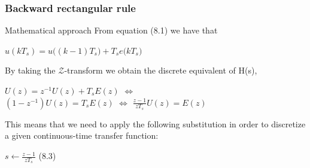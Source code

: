 \begin{frame}
	\frametitle{Backward rectangular rule}
	\begin{block}{Mathematical approach}
		From equation (8.1) we have that
		\begin{center}
			$u(kT_s) = u\big((k-1)T_s \big) + T_s e \big(kT_s \big)$\\
		\end{center}
		By taking the $\mathcal{Z}$-transform we obtain the discrete equivalent of H(s),
		\vspace{-1em}
		\begin{center}
			$U(z) = z^{-1}U(z) + T_s E(z)$ \hspace{0.5em} $\Leftrightarrow$ \hspace{0.5em} \\$(1 - z^{-1})U(z) = T_s E(z)$ \hspace{0.5em} $\Leftrightarrow$ \hspace{0.5em} $\frac{z-1}{zT_s}U(z) = E(z)$
		\end{center}
		This means that we need to apply the following substitution in order to discretize a given continuous-time transfer function:
		\begin{center}
			$s \gets \frac{z-1}{zT_s}$ (8.3)
		\end{center}
	\end{block}
\end{frame}

